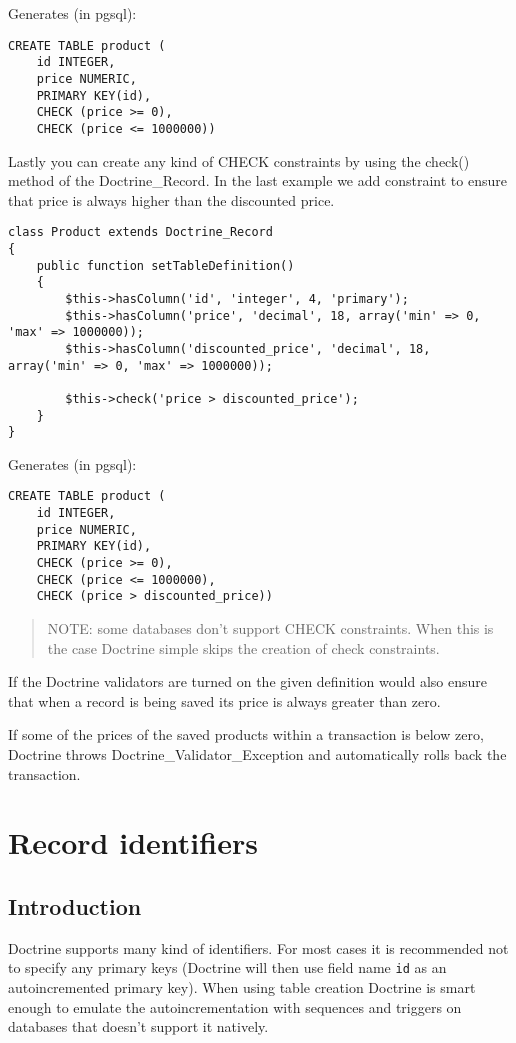 \documentclass[11pt,a4paper]{report}
\begin{document}
Generates (in pgsql):

\begin{verbatim}
CREATE TABLE product (
    id INTEGER,
    price NUMERIC,
    PRIMARY KEY(id),
    CHECK (price >= 0),
    CHECK (price <= 1000000))
\end{verbatim}

Lastly you can create any kind of CHECK constraints by using the check() method of the Doctrine\_Record. In the last example we add constraint to ensure that price is always higher than the discounted price.

\begin{verbatim}
class Product extends Doctrine_Record
{
    public function setTableDefinition()
    {
        $this->hasColumn('id', 'integer', 4, 'primary');
        $this->hasColumn('price', 'decimal', 18, array('min' => 0, 'max' => 1000000));
        $this->hasColumn('discounted_price', 'decimal', 18, array('min' => 0, 'max' => 1000000));

        $this->check('price > discounted_price');
    }
}
\end{verbatim}

Generates (in pgsql):

\begin{verbatim}
CREATE TABLE product (
    id INTEGER,
    price NUMERIC,
    PRIMARY KEY(id),
    CHECK (price >= 0),
    CHECK (price <= 1000000),
    CHECK (price > discounted_price))
\end{verbatim}

\begin{quote}
NOTE: some databases don't support CHECK constraints. When this is the case Doctrine simple skips the creation of check constraints.\end{quote}

If the Doctrine validators are turned on the given definition would also ensure that when a record is being saved its price is always greater than zero.

If some of the prices of the saved products within a transaction is below zero, Doctrine throws Doctrine\_Validator\_Exception and automatically rolls back the transaction.

\section{Record identifiers}
\subsection{Introduction}
Doctrine supports many kind of identifiers. For most cases it is recommended not to specify any primary keys (Doctrine will then use field name \texttt{id} as an autoincremented primary key). When using table creation Doctrine is smart enough to emulate the autoincrementation with sequences and triggers on databases that doesn't support it natively.
\end{document}

